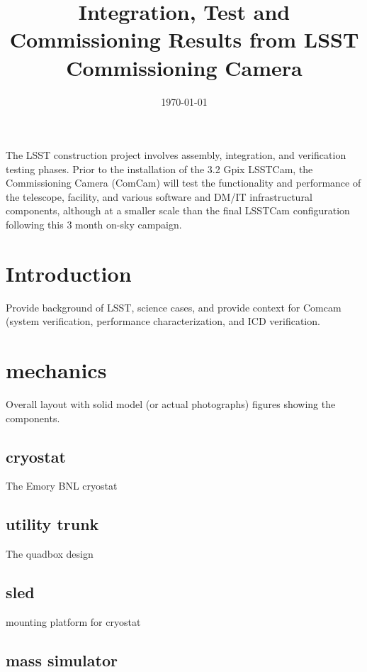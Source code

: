 \documentclass[modern]{aastex62}
\begin{document}

\date{\today}
\title{Integration, Test and Commissioning Results from LSST Commissioning Camera}



The LSST construction project involves assembly, integration, and verification testing phases.  Prior to the installation of the 3.2 Gpix LSSTCam, the Commissioning Camera (ComCam) will test the functionality and performance of the telescope, facility, and various software and DM/IT infrastructural components, although at a smaller scale than the final LSSTCam configuration following this 3 month on-sky campaign.



\section{Introduction}

Provide background of LSST, science cases, and provide context for Comcam (system verification, performance characterization, and ICD verification.


\section{mechanics}

Overall layout with solid model (or actual photographs) figures showing the components.

\subsection{cryostat}

The Emory BNL cryostat

\subsection{utility trunk}

The quadbox design

\subsection{sled}

mounting platform for cryostat

\subsection{mass simulator}
\end{document}
